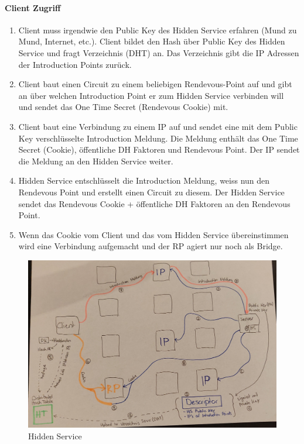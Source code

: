 \paragraph{Client Zugriff}
\begin{enumerate}
    \item Client muss irgendwie den Public Key des Hidden Service erfahren (Mund zu Mund, Internet, etc.). Client bildet den Hash über Public Key des Hidden Service und fragt Verzeichnis (DHT) an. Das Verzeichnis gibt die IP Adressen der Introduction Points zurück.
    \item Client baut einen Circuit zu einem beliebigen Rendevous-Point auf und gibt an über welchen Introduction Point er zum Hidden Service verbinden will und sendet das One Time Secret (Rendevous Cookie) mit.
    \item Client baut eine Verbindung zu einem IP auf und sendet eine mit dem Public Key verschlüsselte Introduction Meldung. Die Meldung enthält das One Time Secret (Cookie), öffentliche DH Faktoren und Rendevous Point. Der IP sendet die Meldung an den Hidden Service weiter.
    \item Hidden Service entschlüsselt die Introduction Meldung, weiss nun den Rendevous Point und erstellt einen Circuit zu diesem. Der Hidden Service sendet das Rendevous Cookie + öffentliche DH Faktoren an den Rendevous Point.
    \item Wenn das Cookie vom Client und das vom Hidden Service übereinstimmen wird eine Verbindung aufgemacht und der RP agiert nur noch als Bridge.
\end{enumerate}

\newpage

\begin{figure}[h]
\centering
\includegraphics[width=1\linewidth]{images/tor_hidden_service.jpg}
\caption{Hidden Service}
\label{fig:hiddenservice2}
\end{figure}

